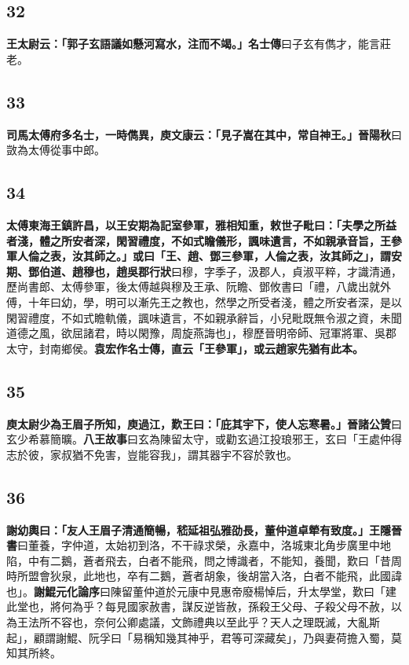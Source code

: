 \subsection*{32}

\textbf{王太尉云：「郭子玄語議如懸河寫水，注而不竭。」}{\footnotesize \textbf{名士傳}曰子玄有儁才，能言莊老。}

\subsection*{33}

\textbf{司馬太傅府多名士，一時儁異，庾文康云：「見子嵩在其中，常自神王。」}{\footnotesize \textbf{晉陽秋}曰敳為太傅從事中郎。}

\subsection*{34}

\textbf{太傅東海王鎮許昌，以王安期為記室參軍，雅相知重，敕世子毗曰：「夫學之所益者淺，體之所安者深，閑習禮度，不如式瞻儀形，諷味遺言，不如親承音旨，王參軍人倫之表，汝其師之。」或曰「王、趙、鄧三參軍，人倫之表，汝其師之」，謂安期、鄧伯道、趙穆也，}{\footnotesize \textbf{趙吳郡行狀}曰穆，字季子，汲郡人，貞淑平粹，才識清通，歷尚書郎、太傅參軍，後太傅越與穆及王承、阮瞻、鄧攸書曰「禮，八歲出就外傅，十年曰幼，學，明可以漸先王之教也，然學之所受者淺，體之所安者深，是以閑習禮度，不如式瞻軌儀，諷味遺言，不如親承辭旨，小兒毗既無令淑之資，未聞道德之風，欲屈諸君，時以閑豫，周旋燕誨也」，穆歷晉明帝師、冠軍將軍、吳郡太守，封南鄉侯。}\textbf{袁宏作名士傳，直云「王參軍」，或云趙家先猶有此本。}

\subsection*{35}

\textbf{庾太尉少為王眉子所知，庾過江，歎王曰：「庇其宇下，使人忘寒暑。」}{\footnotesize \textbf{晉諸公贊}曰玄少希慕簡曠。\textbf{八王故事}曰玄為陳留太守，或勸玄過江投琅邪王，玄曰「王處仲得志於彼，家叔猶不免害，豈能容我」，謂其器宇不容於敦也。}

\subsection*{36}

\textbf{謝幼輿曰：「友人王眉子清通簡暢，嵇延祖弘雅劭長，董仲道卓犖有致度。」}{\footnotesize \textbf{王隱晉書}曰董養，字仲道，太始初到洛，不干祿求榮，永嘉中，洛城東北角步廣里中地陷，中有二鵝，蒼者飛去，白者不能飛，問之博識者，不能知，養聞，歎曰「昔周時所盟會狄泉，此地也，卒有二鵝，蒼者胡象，後胡當入洛，白者不能飛，此國諱也」。\textbf{謝鯤元化論序}曰陳留董仲道於元康中見惠帝廢楊悼后，升太學堂，歎曰「建此堂也，將何為乎？每見國家赦書，謀反逆皆赦，孫殺王父母、子殺父母不赦，以為王法所不容也，奈何公卿處議，文飾禮典以至此乎？天人之理既滅，大亂斯起」，顧謂謝鯤、阮孚曰「易稱知幾其神乎，君等可深藏矣」，乃與妻荷擔入蜀，莫知其所終。}

